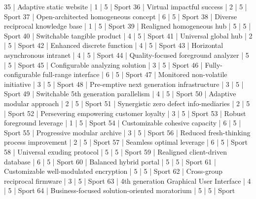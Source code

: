 \begin{enumerate}
\begin{pseudo*}
      35 | Adaptive static website                          |        1 |      5 | Sport
      36 | Virtual impactful success                        |        2 |      5 | Sport
      37 | Open-architected homogeneous concept             |        6 |      5 | Sport
      38 | Diverse reciprocal knowledge base                |        1 |      5 | Sport
      39 | Realigned homogeneous hub                        |        5 |      5 | Sport
      40 | Switchable tangible product                      |        4 |      5 | Sport
      41 | Universal global hub                             |        2 |      5 | Sport
      42 | Enhanced discrete function                       |        4 |      5 | Sport
      43 | Horizontal asynchronous intranet                 |        4 |      5 | Sport
      44 | Quality-focused foreground analyzer              |        5 |      5 | Sport
      45 | Configurable analyzing solution                  |        3 |      5 | Sport
      46 | Fully-configurable full-range interface          |        6 |      5 | Sport
      47 | Monitored non-volatile initiative                |        3 |      5 | Sport
      48 | Pre-emptive next generation infrastructure       |        3 |      5 | Sport
      49 | Switchable 5th generation parallelism            |        4 |      5 | Sport
      50 | Adaptive modular approach                        |        2 |      5 | Sport
      51 | Synergistic zero defect info-mediaries           |        2 |      5 | Sport
      52 | Persevering empowering customer loyalty          |        3 |      5 | Sport
      53 | Robust foreground leverage                       |        1 |      5 | Sport
      54 | Customizable cohesive capacity                   |        6 |      5 | Sport
      55 | Progressive modular archive                      |        3 |      5 | Sport
      56 | Reduced fresh-thinking process improvement       |        2 |      5 | Sport
      57 | Seamless optimal leverage                        |        6 |      5 | Sport
      58 | Universal exuding protocol                       |        5 |      5 | Sport
      59 | Realigned client-driven database                 |        6 |      5 | Sport
      60 | Balanced hybrid portal                           |        5 |      5 | Sport
      61 | Customizable well-modulated encryption           |        5 |      5 | Sport
      62 | Cross-group reciprocal firmware                  |        3 |      5 | Sport
      63 | 4th generation Graphical User Interface          |        4 |      5 | Sport
      64 | Business-focused solution-oriented moratorium    |        5 |      5 | Sport

\end{pseudo*}
\end{enumerate}
